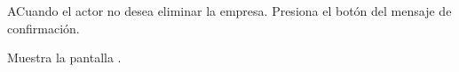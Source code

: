 \begin{UCtrayectoriaA}{A}{Cuando el actor no desea eliminar la empresa.}
	\UCpaso [\UCactor] Presiona el botón  del mensaje de confirmación.

	\UCpaso Muestra la pantalla . 
\end{UCtrayectoriaA}


